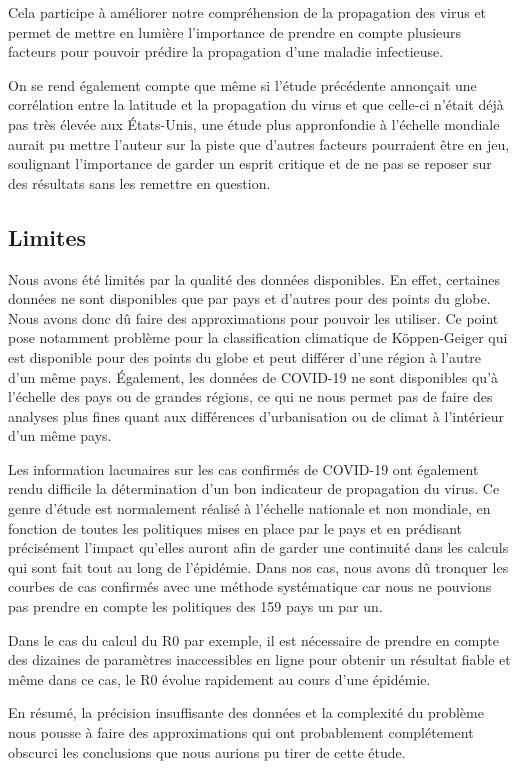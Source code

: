 \documentclass[12pt]{iEEEtran}
\begin{document}
Cela participe à améliorer notre compréhension de la propagation des virus et permet de mettre
en lumière l'importance de prendre en compte plusieurs facteurs pour pouvoir prédire la propagation
d'une maladie infectieuse.

On se rend également compte que même si l'étude précédente annonçait une corrélation entre la latitude
et la propagation du virus et que celle-ci n'était déjà pas très élevée aux États-Unis, une étude
plus appronfondie à l'échelle mondiale aurait pu mettre l'auteur sur la piste que d'autres facteurs
pourraient être en jeu, soulignant l'importance de garder un esprit critique et de ne pas se reposer
sur des résultats sans les remettre en question.

\subsection{Limites}
Nous avons été limités par la qualité des données disponibles. En effet, certaines données
ne sont disponibles que par pays et d'autres pour des points du globe. Nous avons donc dû
faire des approximations pour pouvoir les utiliser. Ce point pose notamment problème pour
la classification climatique de Köppen-Geiger qui est disponible pour des points du globe et
peut différer d'une région à l'autre d'un même pays. Également, les données de COVID-19
ne sont disponibles qu'à l'échelle des pays ou de grandes régions, ce qui ne nous permet
pas de faire des analyses plus fines quant aux différences d'urbanisation ou de climat
à l'intérieur d'un même pays.

Les information lacunaires sur les cas confirmés de COVID-19 ont également rendu difficile
la détermination d'un bon indicateur de propagation du virus. Ce genre d'étude est normalement
réalisé à l'échelle nationale et non mondiale, en fonction de toutes les politiques
mises en place par le pays et en prédisant précisément l'impact qu'elles auront
afin de garder une continuité dans les calculs qui sont fait tout au long de l'épidémie.
Dans nos cas, nous avons dû tronquer les courbes de cas confirmés avec une méthode 
systématique car nous ne pouvions pas prendre en compte les politiques des 159 pays
un par un.

Dans le cas du calcul du R0 par exemple, il
est nécessaire de prendre en compte des dizaines de paramètres inaccessibles en ligne
pour obtenir un résultat fiable et même dans ce cas,
le R0 évolue rapidement au cours d'une épidémie. 

En résumé, la précision insuffisante des données et la complexité du problème nous pousse
à faire des approximations qui ont probablement complétement obscurci les
conclusions que nous aurions pu tirer de cette étude.
\end{document}
